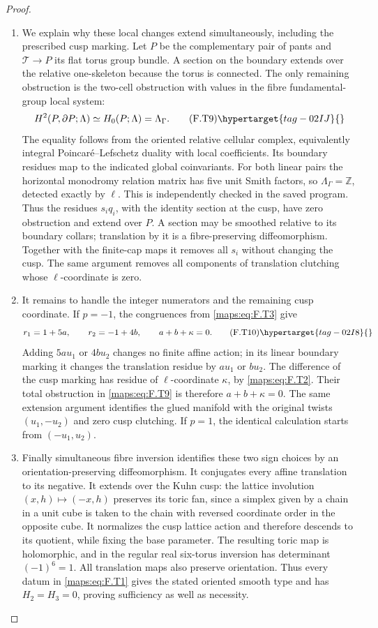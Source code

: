 \begin{proof}
\begin{enumerate}[label={$\langle1\rangle$\arabic*.}]
\item We explain why these local changes extend simultaneously,
including the prescribed cusp marking.
Let $P$ be the complementary pair of pants and
$\mathcal T\to P$ its flat torus group bundle.
A section on the boundary extends over the relative
one-skeleton because the torus is connected.
The only remaining obstruction is the two-cell obstruction
with values in the fibre fundamental-group local system:
\[
 H^2(P,\partial P;\Lambda)
        \simeq H_0(P;\Lambda)=\Lambda_\Gamma.
 \tag{F.T9}\hypertarget{tag-02IJ}{}\label{maps:eq:F.T9}
\]
The equality follows from the oriented relative cellular
complex, equivalently integral Poincar\'e--Lefschetz duality
with local coefficients.  Its boundary residues map to
the indicated global coinvariants.
For both linear pairs the horizontal monodromy relation
matrix has five unit Smith factors, so
$\Lambda_\Gamma=\mathbb Z$, detected exactly by $\ell$.
This is independently checked in the saved program.
Thus the residues $s_iq_i$, with the identity section at the
cusp, have zero obstruction and extend over $P$.
A section may be smoothed relative to its boundary collars;
translation by it is a fibre-preserving diffeomorphism.
Together with the finite-cap maps it removes all $s_i$
without changing the cusp.
The same argument removes all components of translation
clutching whose $\ell$-coordinate is zero.

\item It remains to handle the integer numerators and the remaining
cusp coordinate.  If $p=-1$, the congruences from \eqref{maps:eq:F.T3}
give
\[
 r_1=1+5a,\qquad r_2=-1+4b,
 \qquad a+b+\kappa=0.
 \tag{F.T10}\hypertarget{tag-02I8}{}\label{maps:eq:F.T10}
\]
Adding $5a u_1$ or $4b u_2$ changes no finite affine action;
in its linear boundary marking it changes the translation
residue by $a u_1$ or $b u_2$.
The difference of the cusp marking has residue of
$\ell$-coordinate $\kappa$, by \eqref{maps:eq:F.T2}.
Their total obstruction in \eqref{maps:eq:F.T9} is therefore
$a+b+\kappa=0$.
The same extension argument identifies the glued manifold
with the original twists $(u_1,-u_2)$ and zero cusp
clutching.
If $p=1$, the identical calculation starts from
$(-u_1,u_2)$.

\item Finally simultaneous fibre inversion identifies these two
sign choices by an orientation-preserving diffeomorphism.
It conjugates every affine translation to its negative.
It extends over the Kuhn cusp: the lattice involution
$(x,h)\mapsto(-x,h)$ preserves its toric fan, since a
simplex given by a chain in a unit cube is taken to the
chain with reversed coordinate order in the opposite cube.
It normalizes the cusp lattice action and therefore descends
to its quotient, while fixing the base parameter.  The resulting toric map is holomorphic,
and in the regular real six-torus inversion has determinant
$(-1)^6=1$.  All translation maps also preserve orientation.
Thus every datum in \eqref{maps:eq:F.T1} gives the stated oriented smooth
type and has $H_2=H_3=0$, proving sufficiency as well as
necessity.


\end{enumerate}
\end{proof}
